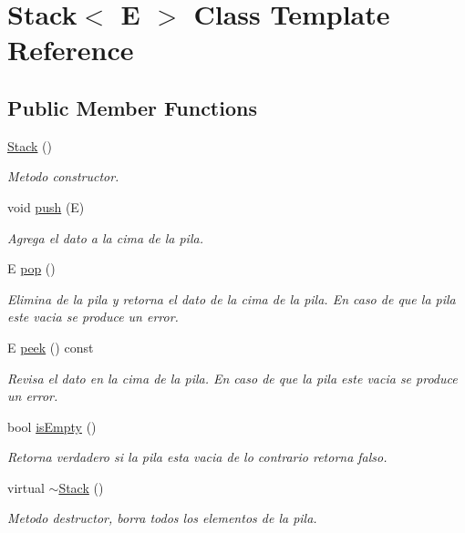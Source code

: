 \hypertarget{classStack}{\section{Stack$<$ E $>$ Class Template Reference}
\label{classStack}
}
\subsection*{Public Member Functions}
\begin{DoxyCompactItemize}
\item 
\hypertarget{classStack_a561be1726ac9649a9ee3f80a4ca8e4b5}{\hyperlink{classStack_a561be1726ac9649a9ee3f80a4ca8e4b5}{Stack} ()}\label{classStack_a561be1726ac9649a9ee3f80a4ca8e4b5}

\begin{DoxyCompactList}\small\item\em Metodo constructor. \end{DoxyCompactList}\item 
void \hyperlink{classStack_af71e3e142fba5bb861b66b4882289b31}{push} (E)
\begin{DoxyCompactList}\small\item\em Agrega el dato a la cima de la pila. \end{DoxyCompactList}\item 
E \hyperlink{classStack_a5ba7a4c8eec39757e28f95da49f06d52}{pop} ()
\begin{DoxyCompactList}\small\item\em Elimina de la pila y retorna el dato de la cima de la pila. En caso de que la pila este vacia se produce un error. \end{DoxyCompactList}\item 
E \hyperlink{classStack_a19a17240bf7045cf6a3a9497e1091433}{peek} () const 
\begin{DoxyCompactList}\small\item\em Revisa el dato en la cima de la pila. En caso de que la pila este vacia se produce un error. \end{DoxyCompactList}\item 
bool \hyperlink{classStack_a0ce2804f35c0c8cfb999535f35fa438b}{is\-Empty} ()
\begin{DoxyCompactList}\small\item\em Retorna verdadero si la pila esta vacia de lo contrario retorna falso. \end{DoxyCompactList}\item 
\hypertarget{classStack_ad08e4c32f07b8d967913f8b1a45f8620}{virtual \hyperlink{classStack_ad08e4c32f07b8d967913f8b1a45f8620}{$\sim$\-Stack} ()}\label{classStack_ad08e4c32f07b8d967913f8b1a45f8620}

\begin{DoxyCompactList}\small\item\em Metodo destructor, borra todos los elementos de la pila. \end{DoxyCompactList}\end{DoxyCompactItemize}


